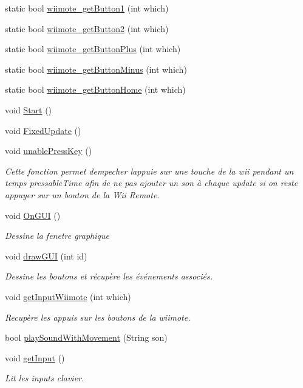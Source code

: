 \begin{DoxyCompactItemize}
static bool \hyperlink{class_music_a835f4686d6c9f04048ac82846d80c68d}{wiimote\+\_\+get\+Button1} (int which)
\item 
static bool \hyperlink{class_music_a159e2b41593b313b806b1fa75855a3b1}{wiimote\+\_\+get\+Button2} (int which)
\item 
static bool \hyperlink{class_music_afdd08708b534b7010afccc75124d8046}{wiimote\+\_\+get\+Button\+Plus} (int which)
\item 
static bool \hyperlink{class_music_a86a3c5ae8040d1c655a595ca23c61c33}{wiimote\+\_\+get\+Button\+Minus} (int which)
\item 
static bool \hyperlink{class_music_a24b68dad0f9ae028714d3106c748eda4}{wiimote\+\_\+get\+Button\+Home} (int which)
\item 
void \hyperlink{class_music_a88677b5b17d7881742cf8d0e23ac8207}{Start} ()
\item 
void \hyperlink{class_music_a57440cf9285a10dee627479fa0b7a3aa}{Fixed\+Update} ()
\item 
void \hyperlink{class_music_acb4d0b5d2b535f89fd14f1886baab776}{unable\+Press\+Key} ()
\begin{DoxyCompactList}\small\item\em Cette fonction permet d\textquotesingle{}empecher l\textquotesingle{}appuie sur une touche de la wii pendant un temps \textquotesingle{}pressable\+Time\textquotesingle{} afin de ne pas ajouter un son à chaque update si on reste appuyer sur un bouton de la Wii Remote. \end{DoxyCompactList}\item 
void \hyperlink{class_music_a034233438c74e4b0d6f1fecf5de6cacb}{On\+G\+U\+I} ()
\begin{DoxyCompactList}\small\item\em Dessine la fenetre graphique \end{DoxyCompactList}\item 
void \hyperlink{class_music_a67cf059d4e7f913a246a06e53d177e6c}{draw\+G\+U\+I} (int id)
\begin{DoxyCompactList}\small\item\em Dessine les boutons et récupère les événements associés. \end{DoxyCompactList}\item 
void \hyperlink{class_music_a6bcab145b7a68dac28bed9bc32affc44}{get\+Input\+Wiimote} (int which)
\begin{DoxyCompactList}\small\item\em Recupère les appuis sur les boutons de la wiimote. \end{DoxyCompactList}\item 
bool \hyperlink{class_music_a09593624eba620da5d6cbb09d6e2e845}{play\+Sound\+With\+Movement} (String son)
\item 
void \hyperlink{class_music_a063497fdbf5be69712dc08866e0e2ea5}{get\+Input} ()
\begin{DoxyCompactList}\small\item\em Lit les inputs clavier. \end{DoxyCompactList}\end{DoxyCompactItemize}
